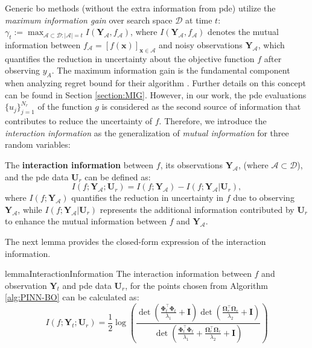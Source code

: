 Generic \ac{bo} methods (without the extra information from \ac{pde}) utilize the \textit{maximum information gain} over search space $\mathcal{D}$ at time $t$:
    $\gamma_t := \max_{\mathcal{A} \subset \mathcal{D}: \lvert \mathcal{A} \rvert=t} I(\mathbf{Y}_\mathcal{A}, f_\mathcal{A})$, 
    where $I(\mathbf{Y}_\mathcal{A}, f_\mathcal{A})$ denotes the mutual information between $f_\mathcal{A} = [f(\mathbf{x})]_{\mathbf{x}\in \mathcal{A}}$ and noisy observations $\mathbf{Y}_\mathcal{A}$, which quantifies the reduction in uncertainty about the objective function $f$ after observing $y_A$. The maximum information gain is the fundamental component when analyzing regret bound for their algorithm \citep{srinivas2009gaussian,vakili2021optimal}. Further details on this concept can be found in Section \ref{section:MIG}. However, in our work, the \ac{pde} evaluations $\{u_j\}_{j=1}^{N_r}$ of the function $g$ is considered as the second source of information that contributes to reduce the uncertainty of $f$. Therefore, we introduce the \textit{interaction information} as the generalization of \textit{mutual information} for three random variables:
\begin{definition}
\label{def:pinn-bo_interaction_information}
The \textbf{interaction information} between $f$,  its observations $\mathbf{Y}_\mathcal{A}$, (where $ \mathcal{A} \subset \mathcal{D}$), and the \ac{pde} data $\mathbf{U}_r$ can be defined as:
\[
I (f; \mathbf{Y}_\mathcal{A}; \mathbf{U}_r) = I (f; \mathbf{Y}_\mathcal{A}) - I (f; \mathbf{Y}_\mathcal{A} \rvert \mathbf{U}_r),
\]
where $I(f; \mathbf{Y}_\mathcal{A})$ quantifies the reduction in uncertainty in $f$ due to observing $\mathbf{Y}_\mathcal{A}$, while $I(f; \mathbf{Y}_\mathcal{A} \rvert \mathbf{U}_r)$ represents the additional information contributed by $\mathbf{U}_r$ to enhance the mutual information between $f$ and $\mathbf{Y}_\mathcal{A}$. 
\end{definition}
The next lemma provides the closed-form expression of the interaction information. 
\begin{restatable}{lemma}{InteractionInformation} 
    \label{lemma:pinn-bo_interaction_information_formula}
    The interaction information between $f$ and observation $\mathbf{Y}_t$ and \ac{pde} data $\mathbf{U}_r$, for the points chosen from Algorithm \ref{alg:PINN-BO} can be calculated as:
    \begin{equation*}
        I (f; \mathbf{Y}_t; \mathbf{U}_r) = \frac{1}{2}  \log (\frac{\det(\frac{\boldsymbol{\Phi}_t^\top \boldsymbol{\Phi}_t}{\lambda_1} + \mathbf{I})\det(\frac{\boldsymbol{\Omega}_r^\top \boldsymbol{\Omega}_r}{\lambda_2} + \mathbf{I})}{\det(\frac{\boldsymbol{\Phi}_t^\top \boldsymbol{\Phi}_t}{\lambda_1} + \frac{\boldsymbol{\Omega}_r^\top \boldsymbol{\Omega}_r}{\lambda_2} + \mathbf{I})})
    \end{equation*}
\end{restatable}

